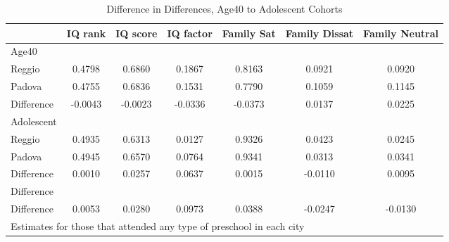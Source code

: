 \begin{table}[htbp]\centering
\caption{Difference in Differences, Age40 to Adolescent Cohorts}
\begin{tabular}{l*{6}{c}}
\hline\hline
            &     IQ rank&    IQ score&   IQ factor&  Family Sat&Family Dissat&Family Neutral\\
\hline
Age40       &            &            &            &            &            &            \\
Reggio      &      0.4798&      0.6860&      0.1867&      0.8163&      0.0921&      0.0920\\
Padova      &      0.4755&      0.6836&      0.1531&      0.7790&      0.1059&      0.1145\\
Difference  &     -0.0043&     -0.0023&     -0.0336&     -0.0373&      0.0137&      0.0225\\
\hline
Adolescent  &            &            &            &            &            &            \\
Reggio      &      0.4935&      0.6313&      0.0127&      0.9326&      0.0423&      0.0245\\
Padova      &      0.4945&      0.6570&      0.0764&      0.9341&      0.0313&      0.0341\\
Difference  &      0.0010&      0.0257&      0.0637&      0.0015&     -0.0110&      0.0095\\
\hline
Difference  &            &            &            &            &            &            \\
Difference  &      0.0053&      0.0280&      0.0973&      0.0388&     -0.0247&     -0.0130\\
\hline\hline
\multicolumn{7}{l}{\footnotesize Estimates for those that attended any type of preschool in each city}\\
\end{tabular}
\end{table}

